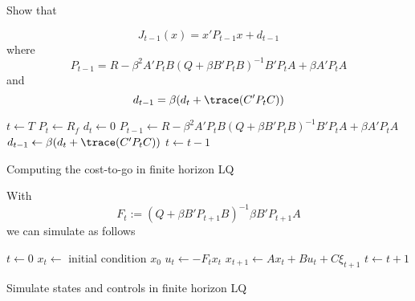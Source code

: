 \begin{frame}
    
    \Ex Show that

    \begin{equation*}
        J_{t-1} (x) = x' P_{t-1} x + d_{t-1}
    \end{equation*}
    where
    \begin{equation*}
        \label{eq:lq_finr}
        P_{t-1} = R - \beta^2 A' P_t B (Q + \beta B' P_t B)^{-1} B' P_t A + \beta A' P_t A
    \end{equation*}
    and
    \begin{equation*}
        \label{eq:lq_finrd}
        d_{t-1} = \beta (d_t + \trace(C' P_t C))
    \end{equation*}


\end{frame}



\begin{frame}
    
    \begin{algorithm}[H]
        $t \leftarrow T$ \;
        $P_t \leftarrow R_f$ \;
        $d_t \leftarrow 0$ \;
        {
            $P_{t-1} \leftarrow R - \beta^2 A' P_t B (Q + \beta B' P_t B)^{-1} B'
                P_t A + \beta A' P_t A$   \;
            $d_{t-1} \leftarrow \beta (d_t + \trace(C' P_t C))$  \;
            $t \leftarrow t-1$
        }
        \caption{\label{algo:iterlq} Computing the cost-to-go in finite horizon LQ}
    \end{algorithm}


\end{frame}


\begin{frame}

    With 
    \begin{equation*}
        F_t := (Q + \beta B' P_{t+1} B)^{-1} \beta B' P_{t+1} A
    \end{equation*}
    we can simulate as follows
    
        \vspace{0.5em}
        \vspace{0.5em}
    \begin{algorithm}[H]
        $t \leftarrow 0$ \;
        $x_t \leftarrow$ initial condition $x_0$ \;
        {
            $u_t \leftarrow - F_t x_t$    \;
            $x_{t+1} \leftarrow A x_t + B u_t + C \xi_{t+1}$ \;
            $t \leftarrow t+1$
        }
        \caption{Simulate states and controls in finite horizon LQ}
    \end{algorithm}


\end{frame}





